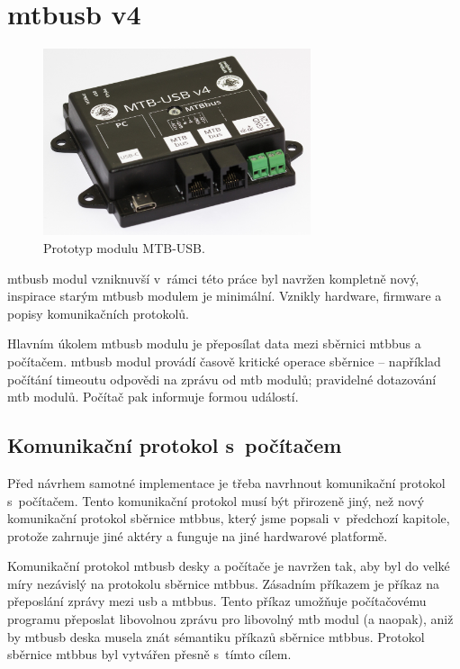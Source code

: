 \section{\gls{mtbusb} v4}

\begin{figure}[ht]
\includegraphics[width=0.7\textwidth]{data/usb-all.jpg}
\caption{Prototyp modulu MTB-USB.}
\label{fig:mtbusb-prototype}
\end{figure}

\gls{mtbusb} modul vzniknuvší v~rámci této práce byl navržen kompletně nový,
inspirace starým \gls{mtbusb} modulem je minimální. Vznikly hardware, firmware
a popisy komunikačních protokolů.

Hlavním úkolem \gls{mtbusb} modulu je přeposílat data mezi sběrnici \gls{mtbbus}
a počítačem. \gls{mtbusb} modul provádí časově kritické operace sběrnice
 – například počítání timeoutu odpovědi na zprávu od \gls{mtb} modulů; pravidelné
dotazování \gls{mtb} modulů. Počítač pak informuje formou událostí.

\subsection{Komunikační protokol s~počítačem}

Před návrhem samotné implementace je třeba navrhnout komunikační protokol
s~počítačem. Tento komunikační protokol musí být přirozeně jiný, než nový
komunikační protokol sběrnice \gls{mtbbus}, který jsme popsali v~předchozí
kapitole, protože zahrnuje jiné aktéry a funguje na jiné hardwarové platformě.

Komunikační protokol \gls{mtbusb} desky a počítače je navržen tak, aby byl do
velké míry nezávislý na protokolu sběrnice \gls{mtbbus}. Zásadním příkazem
je příkaz na přeposlání zprávy mezi \gls{usb} a \gls{mtbbus}. Tento příkaz umožňuje
počítačovému programu přeposlat libovolnou zprávu pro libovolný \gls{mtb} modul
(a naopak), aniž by \gls{mtbusb} deska musela znát sémantiku příkazů sběrnice
\gls{mtbbus}. Protokol sběrnice \gls{mtbbus} byl vytvářen přesně s~tímto
cílem.

